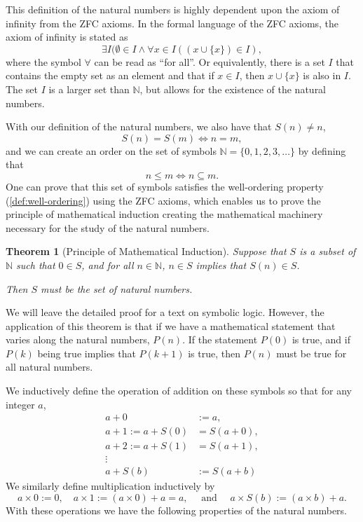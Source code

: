 \documentclass[
]{book}
\newtheorem{theorem}{Theorem}[chapter]
\theoremstyle{definition}
\theoremstyle{definition}
\theoremstyle{definition}
\theoremstyle{definition}
\theoremstyle{remark}
\begin{document}
This definition of the natural numbers is highly dependent upon the axiom of infinity from the ZFC axioms. In the formal language of the ZFC axioms, the axiom of infinity is stated as
\[\exists I ( \emptyset\in I \wedge \forall x\in I((x\cup \{x\})\in I),\] where the symbol \(\forall\) can be read as ``for all''. Or equivalently, there is a set \(I\) that contains the empty set as an element and that if \(x\in I\), then \(x\cup \{x\}\) is also in \(I\). The set \(I\) is a larger set than \(\mathbb{N}\), but allows for the existence of the natural numbers.

With our definition of the natural numbers, we also have that \(S(n)\neq n\), \[S(n)=S(m) \Leftrightarrow n=m,\] and we can create an order on the set of symbols \(\mathbb{N} = \{0, 1, 2, 3, \ldots \}\) by defining that
\[n \leq m \Longleftrightarrow n \subseteq m.\] One can prove that this set of symbols satisfies the well-ordering property (\ref{def:well-ordering}) using the ZFC axioms, which enables us to prove the principle of mathematical induction creating the mathematical machinery necessary for the study of the natural numbers.

\begin{theorem}[Principle of Mathematical Induction]
Suppose that \(S\) is a subset of \(\mathbb{N}\) such that \(0\in S\), and for all \(n\in \mathbb{N}\), \(n\in S\) implies that \(S(n) \in S\).

Then \(S\) must be the set of natural numbers.
\end{theorem}

We will leave the detailed proof for a text on symbolic logic. However, the application of this theorem is that if we have a mathematical statement that varies along the natural numbers, \(P(n)\). If the statement \(P(0)\) is true, and if \(P(k)\) being true implies that \(P(k+1)\) is true, then \(P(n)\) must be true for all natural numbers.

We inductively define the operation of addition on these symbols so that for any integer \(a\),
\begin{align*}
    a+0 &:=a, \\
    a+1 := a+S(0) &= S(a+0), \\
    a+2:=a+S(1) &= S(a+1), \\
    \vdots \\
    a+S(b) &:= S(a+b)
\end{align*}
We similarly define multiplication inductively by
\[a\times 0 := 0, \quad a\times 1 := (a \times 0)+a = a, \quad \mbox{ and } \quad a\times S(b) := (a\times b)+a.\]
With these operations we have the following properties of the natural numbers.
\end{document}
